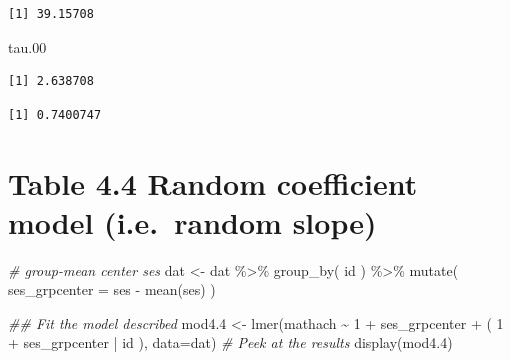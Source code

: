 \documentclass[
  letterpaper,
  DIV=11,
  numbers=noendperiod]{scrreprt}
\newenvironment{Shaded}{}{}
\newcommand{\AttributeTok}[1]{\textcolor[rgb]{0.49,0.56,0.16}{#1}}
\newcommand{\CommentTok}[1]{\textcolor[rgb]{0.38,0.63,0.69}{\textit{#1}}}
\newcommand{\DecValTok}[1]{\textcolor[rgb]{0.25,0.63,0.44}{#1}}
\newcommand{\DocumentationTok}[1]{\textcolor[rgb]{0.73,0.13,0.13}{\textit{#1}}}
\newcommand{\FloatTok}[1]{\textcolor[rgb]{0.25,0.63,0.44}{#1}}
\newcommand{\FunctionTok}[1]{\textcolor[rgb]{0.02,0.16,0.49}{#1}}
\newcommand{\NormalTok}[1]{#1}
\newcommand{\OtherTok}[1]{\textcolor[rgb]{0.00,0.44,0.13}{#1}}
\newcommand{\SpecialCharTok}[1]{\textcolor[rgb]{0.25,0.44,0.63}{#1}}
\begin{document}
\begin{verbatim}
[1] 39.15708
\end{verbatim}

\begin{Shaded}
\begin{Highlighting}[]
\NormalTok{tau}\FloatTok{.00}
\end{Highlighting}
\end{Shaded}

\begin{verbatim}
[1] 2.638708
\end{verbatim}

\begin{Shaded}
\end{Shaded}

\begin{verbatim}
[1] 0.7400747
\end{verbatim}

\section{Table 4.4 Random coefficient model (i.e.~random
slope)}\label{table-4.4-random-coefficient-model-i.e.-random-slope}

\begin{Shaded}
\begin{Highlighting}[]
\CommentTok{\# group{-}mean center ses  }
\NormalTok{dat }\OtherTok{\textless{}{-}}\NormalTok{ dat }\SpecialCharTok{\%\textgreater{}\%} \FunctionTok{group\_by}\NormalTok{( id ) }\SpecialCharTok{\%\textgreater{}\%} 
  \FunctionTok{mutate}\NormalTok{( }\AttributeTok{ses\_grpcenter =}\NormalTok{ ses }\SpecialCharTok{{-}} \FunctionTok{mean}\NormalTok{(ses) )}

\DocumentationTok{\#\# Fit the model described }
\NormalTok{mod4}\FloatTok{.4} \OtherTok{\textless{}{-}} \FunctionTok{lmer}\NormalTok{(mathach }\SpecialCharTok{\textasciitilde{}} \DecValTok{1} \SpecialCharTok{+}\NormalTok{ ses\_grpcenter }\SpecialCharTok{+}\NormalTok{ ( }\DecValTok{1} \SpecialCharTok{+}\NormalTok{ ses\_grpcenter }\SpecialCharTok{|}\NormalTok{ id ), }\AttributeTok{data=}\NormalTok{dat)}
\CommentTok{\# Peek at the results}
\FunctionTok{display}\NormalTok{(mod4}\FloatTok{.4}\NormalTok{)}
\end{Highlighting}
\end{Shaded}
\end{document}
